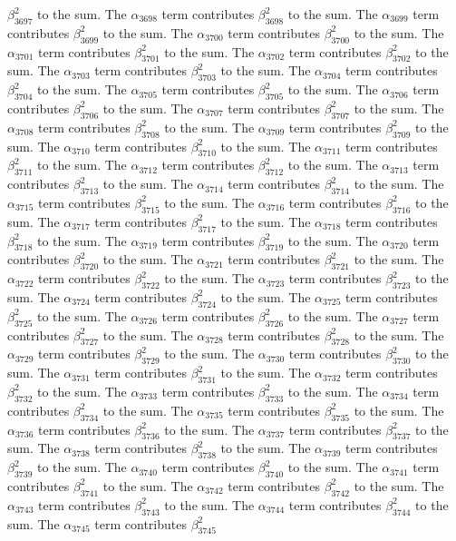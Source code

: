 \begin{lemma}
$\beta_{3697}^{2}$ to the sum. The $\alpha_{3698}$ term contributes $\beta_{3698}^{2}$ to the sum. The $\alpha_{3699}$ term contributes $\beta_{3699}^{2}$ to the sum. The $\alpha_{3700}$ term contributes $\beta_{3700}^{2}$ to the sum. The $\alpha_{3701}$ term contributes $\beta_{3701}^{2}$ to the sum. The $\alpha_{3702}$ term contributes $\beta_{3702}^{2}$ to the sum. The $\alpha_{3703}$ term contributes $\beta_{3703}^{2}$ to the sum. The $\alpha_{3704}$ term contributes $\beta_{3704}^{2}$ to the sum. The $\alpha_{3705}$ term contributes $\beta_{3705}^{2}$ to the sum. The $\alpha_{3706}$ term contributes $\beta_{3706}^{2}$ to the sum. The $\alpha_{3707}$ term contributes $\beta_{3707}^{2}$ to the sum. The $\alpha_{3708}$ term contributes $\beta_{3708}^{2}$ to the sum. The $\alpha_{3709}$ term contributes $\beta_{3709}^{2}$ to the sum. The $\alpha_{3710}$ term contributes $\beta_{3710}^{2}$ to the sum. The $\alpha_{3711}$ term contributes $\beta_{3711}^{2}$ to the sum. The $\alpha_{3712}$ term contributes $\beta_{3712}^{2}$ to the sum. The $\alpha_{3713}$ term contributes $\beta_{3713}^{2}$ to the sum. The $\alpha_{3714}$ term contributes $\beta_{3714}^{2}$ to the sum. The $\alpha_{3715}$ term contributes $\beta_{3715}^{2}$ to the sum. The $\alpha_{3716}$ term contributes $\beta_{3716}^{2}$ to the sum. The $\alpha_{3717}$ term contributes $\beta_{3717}^{2}$ to the sum. The $\alpha_{3718}$ term contributes $\beta_{3718}^{2}$ to the sum. The $\alpha_{3719}$ term contributes $\beta_{3719}^{2}$ to the sum. The $\alpha_{3720}$ term contributes $\beta_{3720}^{2}$ to the sum. The $\alpha_{3721}$ term contributes $\beta_{3721}^{2}$ to the sum. The $\alpha_{3722}$ term contributes $\beta_{3722}^{2}$ to the sum. The $\alpha_{3723}$ term contributes $\beta_{3723}^{2}$ to the sum. The $\alpha_{3724}$ term contributes $\beta_{3724}^{2}$ to the sum. The $\alpha_{3725}$ term contributes $\beta_{3725}^{2}$ to the sum. The $\alpha_{3726}$ term contributes $\beta_{3726}^{2}$ to the sum. The $\alpha_{3727}$ term contributes $\beta_{3727}^{2}$ to the sum. The $\alpha_{3728}$ term contributes $\beta_{3728}^{2}$ to the sum. The $\alpha_{3729}$ term contributes $\beta_{3729}^{2}$ to the sum. The $\alpha_{3730}$ term contributes $\beta_{3730}^{2}$ to the sum. The $\alpha_{3731}$ term contributes $\beta_{3731}^{2}$ to the sum. The $\alpha_{3732}$ term contributes $\beta_{3732}^{2}$ to the sum. The $\alpha_{3733}$ term contributes $\beta_{3733}^{2}$ to the sum. The $\alpha_{3734}$ term contributes $\beta_{3734}^{2}$ to the sum. The $\alpha_{3735}$ term contributes $\beta_{3735}^{2}$ to the sum. The $\alpha_{3736}$ term contributes $\beta_{3736}^{2}$ to the sum. The $\alpha_{3737}$ term contributes $\beta_{3737}^{2}$ to the sum. The $\alpha_{3738}$ term contributes $\beta_{3738}^{2}$ to the sum. The $\alpha_{3739}$ term contributes $\beta_{3739}^{2}$ to the sum. The $\alpha_{3740}$ term contributes $\beta_{3740}^{2}$ to the sum. The $\alpha_{3741}$ term contributes $\beta_{3741}^{2}$ to the sum. The $\alpha_{3742}$ term contributes $\beta_{3742}^{2}$ to the sum. The $\alpha_{3743}$ term contributes $\beta_{3743}^{2}$ to the sum. The $\alpha_{3744}$ term contributes $\beta_{3744}^{2}$ to the sum. The $\alpha_{3745}$ term contributes $\beta_{3745}^{2}$ 
\end{lemma}
